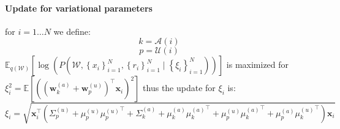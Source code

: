 \documentclass[11pt, a4paper]{article}
\begin{document}
\paragraph{Update for variational parameters}
\noindent for $i=1\dots N$ we define:
$$k=\mathcal{A}(i)$$
$$p=\mathcal{U}(i)$$
$\mathbb{E}_{q(\mathcal{W})} \left[\log\left(P\left(\mathcal{W},\left\{x_i\right\}_{i=1}^N,\left\{r_i\right\}_{i=1}^N \mid \left\{\xi_i\right\}_{i=1}^N\right)\right)\right]$ is maximized for $\xi_i^2=\mathbb{E}\left[\left(\left(\textbf{w}^{(a)}_{k}+\textbf{w}^{(u)}_{p}\right)^\top\textbf{x}_i\right)^2\right]$
\noindent thus the update for $\xi_i$ is:
$$\xi_i=\sqrt{\textbf{x}_i^\top\left(\Sigma^{(u)}_p+\mu^{(u)}_p{\mu^{(u)}_p}^\top+\Sigma^{(a)}_k+\mu^{(a)}_k{\mu^{(a)}_k}^\top+\mu^{(u)}_p {\mu^{(a)}_k}^\top+\mu^{(a)}_p {\mu^{(u)}_k}^\top\right)\textbf{x}_i}$$
\end{document}

